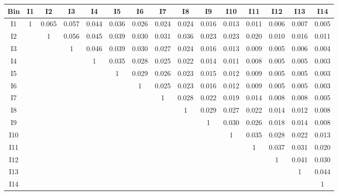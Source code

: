 \begin{tabular}{c@{~~~}c@{~~}c@{~~}c@{~~}c@{~~}c@{~~}c@{~~}c@{~~}c@{~~}c@{~~}c@{~~}c@{~~}c@{~~}c@{~~}c}
\hline
 \hline
Bin	& I1 & I2 & I3 & I4 & I5 & I6 & I7 & I8 & I9 & I10 & I11 & I12 & I13 & I14 \\
\hline
I1	&  1 &  0.065 &  0.057 &  0.044 &  0.036 &  0.026 &  0.024 &  0.024 &  0.016 &  0.013 &  0.011 &  0.006 &  0.007 &  0.005 \\
I2	&   &  1 &  0.056 &  0.045 &  0.039 &  0.030 &  0.031 &  0.036 &  0.023 &  0.023 &  0.020 &  0.010 &  0.016 &  0.011 \\
I3	&   &   &  1 &  0.046 &  0.039 &  0.030 &  0.027 &  0.024 &  0.016 &  0.013 &  0.009 &  0.005 &  0.006 &  0.004 \\
I4	&   &   &   &  1 &  0.035 &  0.028 &  0.025 &  0.022 &  0.014 &  0.011 &  0.008 &  0.005 &  0.005 &  0.003 \\
I5	&   &   &   &   &  1 &  0.029 &  0.026 &  0.023 &  0.015 &  0.012 &  0.009 &  0.005 &  0.005 &  0.003 \\
I6	&   &   &   &   &   &  1 &  0.025 &  0.023 &  0.016 &  0.012 &  0.009 &  0.005 &  0.005 &  0.003 \\
I7	&   &   &   &  &   &   &  1 &  0.028 &  0.022 &  0.019 &  0.014 &  0.008 &  0.008 &  0.005 \\
I8	&   &   &   &   &   &  &   &  1 &  0.029 &  0.027 &  0.022 &  0.014 &  0.012 &  0.008 \\
I9	&   &   &   &   &   &   &   &   &  1 &  0.030 &  0.026 &  0.018 &  0.014 &  0.008 \\
I10	&  &   &   &  &   &   &   &   &   &  1 &  0.035 &  0.028 &  0.022 &  0.013 \\
I11	&   &  &   &   &  &   &   &   &  &   &  1 &  0.037 &  0.031 &  0.020 \\
I12	&   &   &   &   &   &   &   &   &   &   &   &  1 &  0.041 &  0.030 \\
I13	&   &   &   &   &   &   &  &   &   &   &   &   &  1 &  0.044 \\
I14	&   &   &   &   &   &   &   &   &   &   &   &   &   &  1 \\
\hline
 \hline
\end{tabular}
